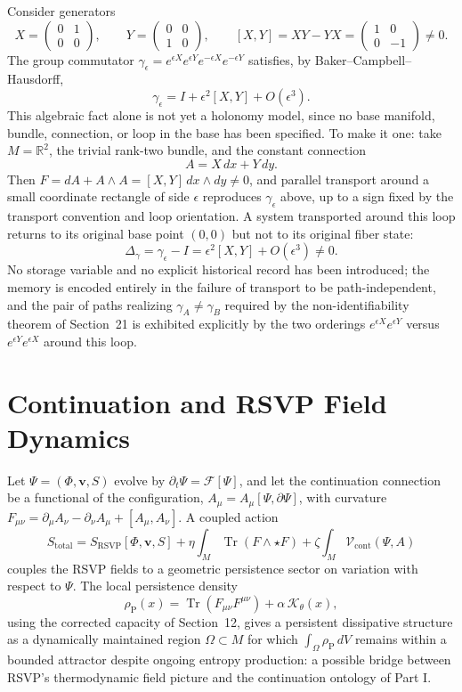 \documentclass[11pt]{article}
\newcommand{\Tr}{\operatorname{Tr}}
\begin{document}
Consider generators
\[
X = \begin{pmatrix} 0 & 1 \\ 0 & 0 \end{pmatrix}, \qquad Y = \begin{pmatrix} 0 & 0 \\ 1 & 0 \end{pmatrix}, \qquad [X,Y] = XY - YX = \begin{pmatrix} 1 & 0 \\ 0 & -1 \end{pmatrix} \neq 0.
\]
The group commutator $\gamma_\epsilon = e^{\epsilon X} e^{\epsilon Y} e^{-\epsilon X} e^{-\epsilon Y}$ satisfies, by Baker--Campbell--Hausdorff,
\[
\gamma_\epsilon = I + \epsilon^2 [X,Y] + O(\epsilon^3).
\]
This algebraic fact alone is not yet a holonomy model, since no base manifold, bundle, connection, or loop in the base has been specified. To make it one: take $M = \mathbb{R}^2$, the trivial rank-two bundle, and the constant connection
\[
A = X\, dx + Y\, dy.
\]
Then $F = dA + A \wedge A = [X,Y]\, dx \wedge dy \neq 0$, and parallel transport around a small coordinate rectangle of side $\epsilon$ reproduces $\gamma_\epsilon$ above, up to a sign fixed by the transport convention and loop orientation. A system transported around this loop returns to its original base point $(0,0)$ but not to its original fiber state:
\[
\Delta_\gamma = \gamma_\epsilon - I = \epsilon^2 [X,Y] + O(\epsilon^3) \neq 0.
\]
No storage variable and no explicit historical record has been introduced; the memory is encoded entirely in the failure of transport to be path-independent, and the pair of paths realizing $\gamma_A \neq \gamma_B$ required by the non-identifiability theorem of Section~21 is exhibited explicitly by the two orderings $e^{\epsilon X} e^{\epsilon Y}$ versus $e^{\epsilon Y} e^{\epsilon X}$ around this loop.

\section{Continuation and RSVP Field Dynamics}
\label{app:rsvp}

Let $\Psi = (\Phi, \mathbf{v}, S)$ evolve by $\partial_t \Psi = \mathcal{F}[\Psi]$, and let the continuation connection be a functional of the configuration, $A_\mu = A_\mu[\Psi, \partial \Psi]$, with curvature $F_{\mu\nu} = \partial_\mu A_\nu - \partial_\nu A_\mu + [A_\mu, A_\nu]$. A coupled action
\[
S_{\mathrm{total}} = S_{\mathrm{RSVP}}[\Phi, \mathbf{v}, S] + \eta \int_M \Tr(F \wedge \star F) + \zeta \int_M \mathcal{V}_{\mathrm{cont}}(\Psi, A)
\]
couples the RSVP fields to a geometric persistence sector on variation with respect to $\Psi$. The local persistence density
\[
\rho_{\mathrm{P}}(x) = \Tr(F_{\mu\nu} F^{\mu\nu}) + \alpha\, \mathcal{K}_\theta(x),
\]
using the corrected capacity of Section~12, gives a persistent dissipative structure as a dynamically maintained region $\Omega \subset M$ for which $\int_\Omega \rho_{\mathrm{P}}\, dV$ remains within a bounded attractor despite ongoing entropy production: a possible bridge between RSVP's thermodynamic field picture and the continuation ontology of Part I.
\end{document}
